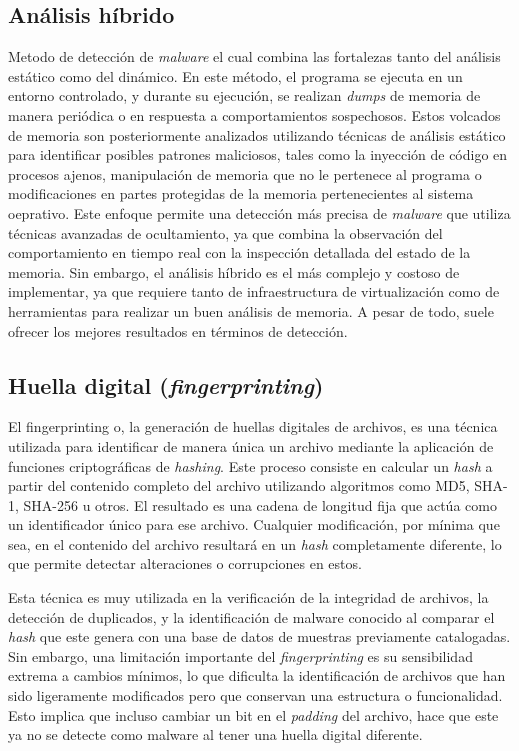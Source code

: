\subsection{Análisis híbrido}

Metodo de detección de \textit{malware} el cual combina las fortalezas tanto del análisis estático como del dinámico. En este método, el programa se ejecuta en un entorno controlado, y durante su ejecución, se realizan \textit{dumps} de memoria de manera periódica o en respuesta a comportamientos sospechosos. Estos volcados de memoria son posteriormente analizados utilizando técnicas de análisis estático para identificar posibles  patrones maliciosos, tales como la inyección de código en procesos ajenos, manipulación de memoria que no le pertenece al programa o modificaciones en partes protegidas de la memoria pertenecientes al sistema oeprativo. Este enfoque permite una detección más precisa de \textit{malware} que utiliza técnicas avanzadas de ocultamiento, ya que combina la observación del comportamiento en tiempo real con la inspección detallada del estado de la memoria. Sin embargo, el análisis híbrido es el más complejo y costoso de implementar, ya que requiere tanto de infraestructura de virtualización como de herramientas para realizar un buen análisis de memoria. A pesar de todo, suele ofrecer los mejores resultados en términos de detección.

\subsection{Huella digital (\textit{fingerprinting})}

El fingerprinting o, la generación de huellas digitales de archivos, es una técnica utilizada para identificar de manera única un archivo mediante la aplicación de funciones criptográficas de \textit{hashing}. Este proceso consiste en calcular un \textit{hash} a partir del contenido completo del archivo utilizando algoritmos como MD5, SHA-1, SHA-256 u otros. El resultado es una cadena de longitud fija que actúa como un identificador único para ese archivo. Cualquier modificación, por mínima que sea, en el contenido del archivo resultará en un \textit{hash} completamente diferente, lo que permite detectar alteraciones o corrupciones en estos.

Esta técnica es muy utilizada en la verificación de la integridad de archivos, la detección de duplicados, y la identificación de malware conocido al comparar el \textit{hash} que este genera con una base de datos de muestras previamente catalogadas. Sin embargo, una limitación importante del \textit{fingerprinting} es su sensibilidad extrema a cambios mínimos, lo que dificulta la identificación de archivos que han sido ligeramente modificados pero que conservan una estructura o funcionalidad. Esto implica que incluso cambiar un bit en el \textit{padding} del archivo, hace que este ya no se detecte como malware al tener una huella digital diferente.


